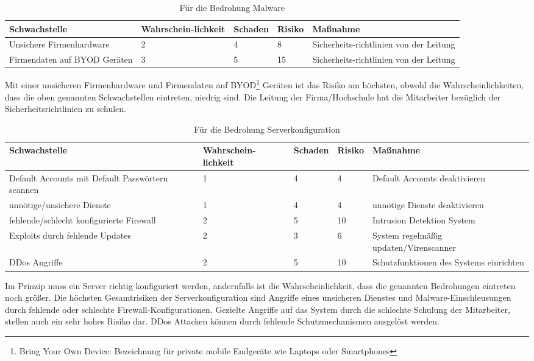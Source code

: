 \begin{table}[H]
\caption{Für die Bedrohung Malware}
\begin{tabu} to \linewidth {X[-1,l,m] X[-1,l,m] X[-1,l,m] X[-1,l,m] X[-1,l,m] }
\toprule 
\textbf{Schwachstelle} & \textbf{Wahrschein-\linebreak{}lichkeit} & \textbf{Schaden} & \textbf{Risiko} & \textbf{Maßnahme}\tabularnewline
\midrule 
Unsichere Firmenhardware & 2 & 4 & 8 & Sicherheits-\linebreak{}richtlinien von der Leitung\tabularnewline
Firmendaten auf BYOD Geräten & 3 & 5 & 15 & Sicherheits-\linebreak{}richtlinien von der Leitung\tabularnewline
\bottomrule 
\end{tabu}
\end{table}

Mit einer unsicheren Firmenhardware und Firmendaten auf BYOD\footnote{Bring Your Own Device: Bezeichnung für private mobile Endgeräte wie Laptops oder Smartphones} Geräten ist das Risiko am höchsten, obwohl die Wahrscheinlichkeiten, dass die oben genannten Schwachstellen eintreten, niedrig sind. Die Leitung der Firma/Hochschule hat die Mitarbeiter bezüglich der Sicherheitsrichtlinien zu schulen.

\begin{table}[H]
\caption{Für die Bedrohung Serverkonfiguration}
\begin{tabu} to \linewidth {X[-1,l,m] X[-1,l,m] X[-1,l,m] X[-1,l,m] X[-1,l,m] }
\toprule 
\textbf{Schwachstelle} & \textbf{Wahrschein-\linebreak{}lichkeit} & \textbf{Schaden} & \textbf{Risiko} & \textbf{Maßnahme}\tabularnewline
\midrule 
Default Accounts mit Default Passwörtern scannen & 1 & 4 & 4 & Default Accounts deaktivieren\tabularnewline
unnötige/unsichere Dienste & 1 & 4 & 4 & unnötige Dienste deaktivieren\tabularnewline
fehlende/schlecht konfigurierte Firewall & 2 & 5 & 10 & Intrusion Detektion System\tabularnewline
Exploits durch fehlende Updates & 2 & 3 & 6 & System regelmäßig updaten/Virenscanner\tabularnewline
DDos Angriffe & 2 & 5 & 10 & Schutzfunktionen des Systems einrichten\tabularnewline
\bottomrule
\end{tabu}
\end{table}

Im Prinzip muss ein Server richtig konfiguriert werden, andernfalls ist die Wahrscheinlichkeit, dass die genannten Bedrohungen eintreten noch größer. Die höchsten Gesamtrisiken der Serverkonfiguration sind Angriffe eines unsicheren Dienstes und Malware-Einschleusungen durch fehlende oder schlechte Firewall-Konfigurationen. Gezielte Angriffe auf das System durch die schlechte Schulung der Mitarbeiter, stellen auch ein sehr hohes Risiko dar. DDos Attacken können durch fehlende Schutzmechanismen ausgelöst werden.

